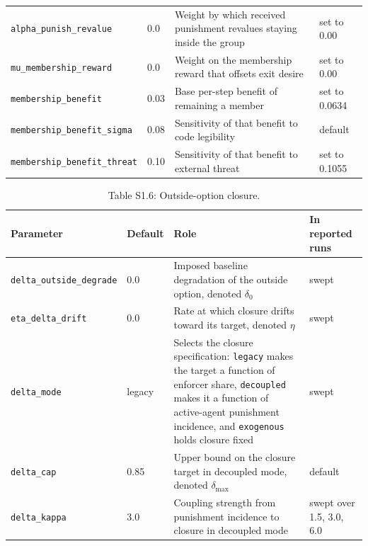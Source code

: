 \documentclass[12pt]{article}
\begin{document}
\begin{table}[htbp]
\begin{tabular}{p{4.9cm}p{1.3cm}p{4.5cm}p{2.4cm}}
\texttt{alpha\_punish\_revalue} & 0.0 & Weight by which received punishment revalues staying inside the group & set to 0.00 \\
\texttt{mu\_membership\_reward} & 0.0 & Weight on the membership reward that offsets exit desire & set to 0.00 \\
\texttt{membership\_benefit} & 0.03 & Base per-step benefit of remaining a member & set to 0.0634 \\
\texttt{membership\_benefit\_sigma} & 0.08 & Sensitivity of that benefit to code legibility & default \\
\texttt{membership\_benefit\_threat} & 0.10 & Sensitivity of that benefit to external threat & set to 0.1055 \\
\bottomrule
\end{tabular}
\end{table}

\begin{table}[htbp]
\centering
\footnotesize
\caption{Table S1.6: Outside-option closure.}
\begin{tabular}{p{4.9cm}p{1.3cm}p{4.5cm}p{2.4cm}}
\toprule
Parameter & Default & Role & In reported runs \\
\midrule
\texttt{delta\_outside\_degrade} & 0.0 & Imposed baseline degradation of the outside option, denoted $\delta_0$ & swept \\
\texttt{eta\_delta\_drift} & 0.0 & Rate at which closure drifts toward its target, denoted $\eta$ & swept \\
\texttt{delta\_mode} & legacy & Selects the closure specification: \texttt{legacy} makes the target a function of enforcer share, \texttt{decoupled} makes it a function of active-agent punishment incidence, and \texttt{exogenous} holds closure fixed & swept \\
\texttt{delta\_cap} & 0.85 & Upper bound on the closure target in decoupled mode, denoted $\delta_{\max}$ & default \\
\texttt{delta\_kappa} & 3.0 & Coupling strength from punishment incidence to closure in decoupled mode & swept over 1.5, 3.0, 6.0 \\
\bottomrule
\end{tabular}
\end{table}
\end{document}
